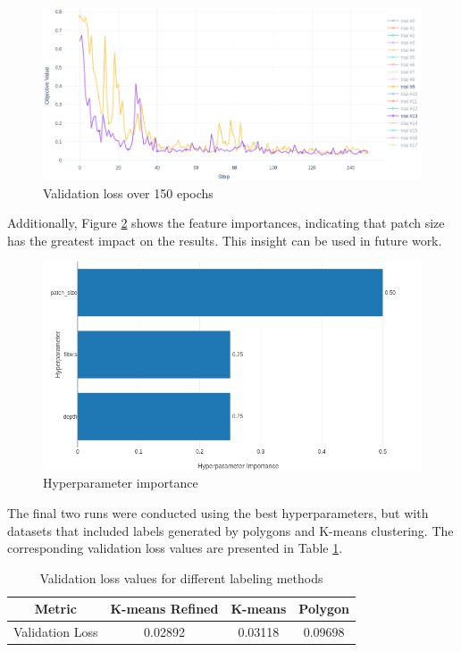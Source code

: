 \begin{figure}[H]
    \centering
    \includegraphics[width=0.75\linewidth]{PICTURES/lossFuncMain.png}
    \caption{Validation loss over 150 epochs}
    \label{fig:validation_loss}
\end{figure}

Additionally, Figure \ref{fig:Hyperparameter-Importance} shows the feature importances, indicating that patch size has the greatest impact on the results. This insight can be used in future work.

\begin{figure}[H]
    \centering
    \includegraphics[width=0.75\linewidth]{PICTURES/importnace.png}
    \caption{Hyperparameter importance}
    \label{fig:Hyperparameter-Importance}
\end{figure}

The final two runs were conducted using the best hyperparameters, but with datasets that included labels generated by polygons and K-means clustering. The corresponding validation loss values are presented in Table \ref{tab:val_loss_values}.

\begin{table}[ht]
\centering
\renewcommand{\arraystretch}{1}
\begin{tabular}{|c|c|c|c|}
\hline
\textbf{Metric} & \textbf{K-means Refined} & \textbf{K-means} & \textbf{Polygon} \\
\hline
Validation Loss & 0.02892 & 0.03118 & 0.09698 \\
\hline
\end{tabular}
\caption{Validation loss values for different labeling methods}
\label{tab:val_loss_values}
\end{table}

